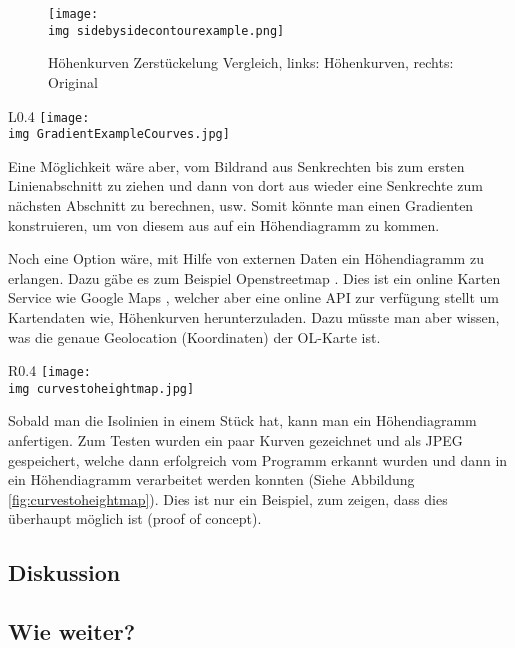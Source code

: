 \newpage

\begin{figure}[hbt]
	\centering
	\texttt{[image: \\img sidebysidecontourexample.png]}
	\caption{Höhenkurven Zerstückelung Vergleich, links: Höhenkurven, rechts: Original}
	\label{fig:courvecompare}
\end{figure}

\begin{wrapfigure}{L}{0.4\textwidth}
	\centering
	\texttt{[image: \\img GradientExampleCourves.jpg]}
	\caption{Gradienten Lösungsansatz}
	\label{fig:gradientexample}
\end{wrapfigure}

Eine Möglichkeit wäre aber, vom Bildrand aus Senkrechten bis zum ersten Linienabschnitt zu ziehen und dann von dort aus wieder eine Senkrechte zum nächsten Abschnitt zu berechnen, usw. Somit könnte man einen Gradienten konstruieren, um von diesem aus auf ein Höhendiagramm zu kommen.

Noch eine Option wäre, mit Hilfe von externen Daten ein Höhendiagramm zu erlangen. Dazu gäbe es zum Beispiel Openstreetmap \cite{openstreetmap:1}. Dies ist ein online Karten Service wie Google Maps  \cite{googlemaps:1}, welcher aber eine online API zur verfügung stellt um Kartendaten wie, Höhenkurven herunterzuladen. Dazu müsste man aber wissen, was die genaue Geolocation (Koordinaten) der OL-Karte ist.


\begin{wrapfigure}{R}{0.4\textwidth}
	\centering
	\texttt{[image: \\img curvestoheightmap.jpg]}
	\caption{Höhendiagramm aus Höhenkurven}
	\label{fig:curvestoheightmap}
\end{wrapfigure}

\newpage

Sobald man die Isolinien in einem Stück hat, kann man ein Höhendiagramm anfertigen. Zum Testen wurden ein paar Kurven gezeichnet und als JPEG gespeichert, welche dann erfolgreich vom Programm erkannt wurden und dann in ein Höhendiagramm verarbeitet werden konnten (Siehe Abbildung \ref{fig:curvestoheightmap}). Dies ist nur ein Beispiel, zum zeigen, dass dies überhaupt möglich ist (proof of concept).

\newpage






\subsection{Diskussion}

\subsection{Wie weiter?}
